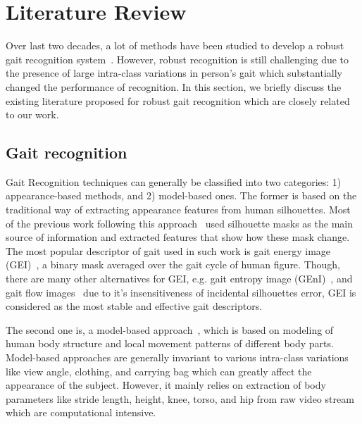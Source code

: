 \chapter{Literature Review} \label{literature_review}
Over last two decades, a lot of methods have been studied to develop a robust gait recognition system~\cite{Rida_19}. However, robust recognition is still challenging due to the presence of large intra-class variations in person's gait which substantially changed the performance of recognition. In this section, we briefly discuss the existing literature proposed for robust gait recognition which are closely related to our work. 

\section{Gait recognition}
Gait Recognition techniques can generally be classified into two categories: 1) appearance-based methods, and 2) model-based ones. The former is based on the traditional way of extracting appearance features from human silhouettes. Most of the previous work following this approach~\cite{Han_06, Bashir_09, Lam_11} used silhouette masks as the main source of information and extracted features that show how these mask change. The most popular descriptor of gait used in such work is gait energy image (GEI)~\cite{Han_06}, a binary mask averaged over the gait cycle of human figure. Though, there are many other alternatives for GEI, e.g. gait entropy image (GEnI)~\cite{Bashir_09}, and gait flow images~\cite{Lam_11} due to it's insensitiveness of incidental silhouettes error, GEI is considered as the most stable and effective gait descriptors.  

The second one is, a model-based approach~\cite{Ariyanto_11, Tafazzoli_10, Feng_16}, which is based on modeling of human body structure and local movement patterns of different body parts. Model-based approaches are generally invariant to various intra-class variations like view angle, clothing, and carrying bag which can greatly affect the appearance of the subject.  However, it mainly relies on extraction of body parameters like stride length, height, knee, torso, and hip from raw video stream which are computational intensive.


